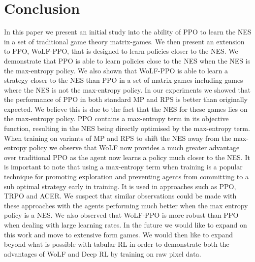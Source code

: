 \documentclass[conference]{IEEEtran}
\begin{document}
\section{Conclusion}


In this paper we present an initial study into the ability of PPO to learn the NES in a set of traditional game theory matrix-games. We then present an extension to PPO, WoLF-PPO, that is designed to learn policies closer to the NES. We demonstrate that PPO is able to learn policies close to the NES when the NES is the max-entropy policy. We also shown that WoLF-PPO is able to learn a strategy closer to the NES than PPO in a set of matrix games including games where the NES is not the max-entropy policy. In our experiments we showed that the performance of PPO in both standard MP and RPS is better than originally expected. We believe this is due to the fact that the NES for these games lies on the max-entropy policy. PPO contains a max-entropy term in its objective function, resulting in the NES being directly optimised by the max-entropy term. When training on variants of MP and RPS to shift the NES away from the max-entropy policy we observe that WoLF now provides a much greater advantage over traditional PPO as the agent now learns a policy much closer to the NES. It is important to note that using a max-entropy term when training is a popular technique for promoting exploration and preventing agents from committing to a sub optimal strategy early in training. It is used in approaches such as PPO\cite{schulman2017proximal}, TRPO\cite{schulman2015trust} and ACER\cite{Wang2017SampleEA}. We suspect that similar observations could be made with these approaches with the agents performing much better when the max entropy policy is a NES. We also observed that WoLF-PPO is more robust than PPO when dealing with large learning rates. In the future we would like to expand on this work and move to extensive form games. We would then like to expand beyond what is possible with tabular RL in order to demonstrate both the advantages of WoLF and Deep RL by training on raw pixel data.





\end{document}

